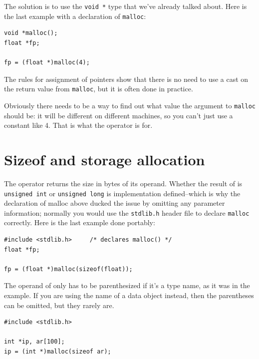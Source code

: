    The solution is to use the \texttt{void *} type that we've already
    talked about. Here is the last example with a declaration of
    \texttt{malloc}:


   \begin{Verbatim}
void *malloc();
float *fp;

fp = (float *)malloc(4);
\end{Verbatim}

   The rules for assignment of pointers show that there is no need to use
    a cast on the return value from \texttt{malloc}, but it is often
    done in practice.


   Obviously there needs to be a way to find out what value the argument
    to \texttt{malloc} should be: it will be different on different
    machines, so you can't just use a constant like 4. That is what the
    \sizeof{} operator is for.


  

 
        \section{Sizeof and storage allocation}
        

  

  The \sizeof{} operator returns the size in bytes of its
   operand. Whether the result of \sizeof{} is \texttt{unsigned
   int} or \texttt{unsigned long} is implementation
   defined--which is why the declaration of malloc above ducked the
   issue by omitting any parameter information; normally you would use the
   \texttt{stdlib.h} header file to declare \texttt{malloc}
   correctly. Here is the last example done portably:


  \begin{Verbatim}
#include <stdlib.h>     /* declares malloc() */
float *fp;

fp = (float *)malloc(sizeof(float));
\end{Verbatim}

  The operand of \sizeof{} only has to be parenthesized if it's
   a type name, as it was in the example. If you are using the name of
   a data object instead, then the parentheses can be omitted, but they
   rarely are.


  \begin{Verbatim}
#include <stdlib.h>

int *ip, ar[100];
ip = (int *)malloc(sizeof ar);
\end{Verbatim}

